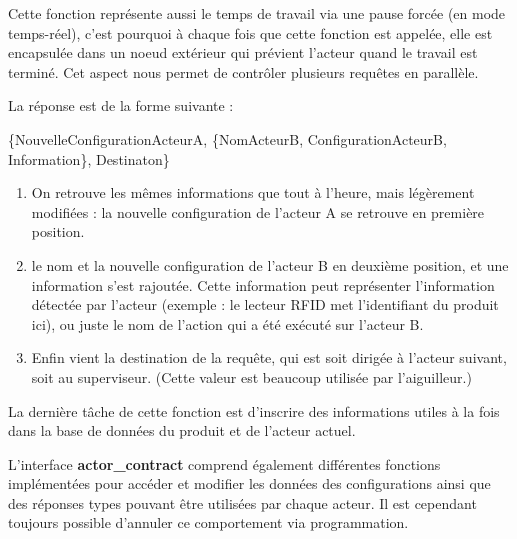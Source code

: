 \documentclass[12pt,a4paper]{article}
\begin{document}
	 	Cette fonction représente aussi le temps de travail via une pause
	 	forcée (en mode temps-réel), c'est pourquoi à chaque fois que cette 
	 	fonction est appelée,
	 	elle est encapsulée dans un noeud extérieur qui prévient l'acteur 
	 	quand le travail est terminé. Cet aspect nous permet de contrôler 
	 	plusieurs requêtes en parallèle.

	 	La réponse est de la forme suivante :

	 	\{NouvelleConfigurationActeurA, 
	 	\{NomActeurB, ConfigurationActeurB, Information\},
	 	Destinaton\}

	 	\begin{enumerate}
	 		\item On retrouve les mêmes informations que tout à l'heure, mais 
	 			légèrement modifiées : la nouvelle configuration de l'acteur A 
	 			se retrouve en première position.
	 		\item le nom et la nouvelle configuration de l'acteur B en deuxième 
	 			position, et une information s'est rajoutée. Cette information 
	 			peut représenter l'information détectée par l'acteur (exemple : 
	 			le lecteur RFID met l'identifiant du produit ici), ou juste le 
	 			nom de l'action qui a été exécuté sur l'acteur B.
	 		\item Enfin vient la destination de la requête, qui est soit dirigée 
	 			à l'acteur suivant, soit au superviseur. (Cette valeur est 
	 			beaucoup utilisée par l'aiguilleur.)
	 	\end{enumerate}

	 	La dernière tâche de cette fonction est d'inscrire des informations 
	 	utiles à la fois dans la base de données du produit et de l'acteur
	 	actuel.

		L'interface \textbf{actor\_contract} comprend également différentes 
		fonctions implémentées pour accéder et modifier les données des 
		configurations ainsi que des réponses types pouvant être utilisées 
		par chaque acteur. Il est cependant toujours possible d'annuler ce 
		comportement via programmation.
	 
\end{document}

